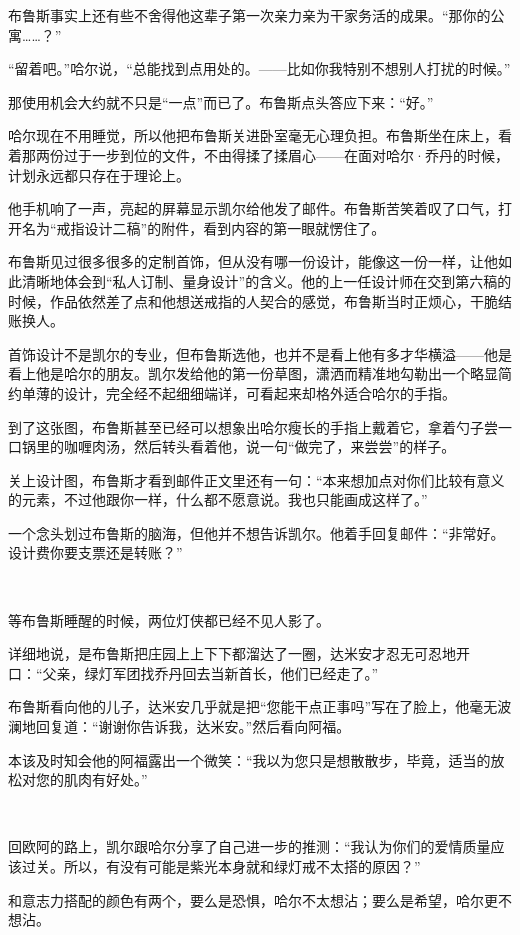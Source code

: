 \documentclass[../main]{subfiles}
\begin{document}
布鲁斯事实上还有些不舍得他这辈子第一次亲力亲为干家务活的成果。“那你的公寓……？”

“留着吧。”哈尔说，“总能找到点用处的。——比如你我特别不想别人打扰的时候。”

那使用机会大约就不只是“一点”而已了。布鲁斯点头答应下来：“好。”

哈尔现在不用睡觉，所以他把布鲁斯关进卧室毫无心理负担。布鲁斯坐在床上，看着那两份过于一步到位的文件，不由得揉了揉眉心——在面对哈尔·乔丹的时候，计划永远都只存在于理论上。

他手机响了一声，亮起的屏幕显示凯尔给他发了邮件。布鲁斯苦笑着叹了口气，打开名为“戒指设计二稿”的附件，看到内容的第一眼就愣住了。

布鲁斯见过很多很多的定制首饰，但从没有哪一份设计，能像这一份一样，让他如此清晰地体会到“私人订制、量身设计”的含义。他的上一任设计师在交到第六稿的时候，作品依然差了点和他想送戒指的人契合的感觉，布鲁斯当时正烦心，干脆结账换人。

首饰设计不是凯尔的专业，但布鲁斯选他，也并不是看上他有多才华横溢——他是看上他是哈尔的朋友。凯尔发给他的第一份草图，潇洒而精准地勾勒出一个略显简约单薄的设计，完全经不起细细端详，可看起来却格外适合哈尔的手指。

到了这张图，布鲁斯甚至已经可以想象出哈尔瘦长的手指上戴着它，拿着勺子尝一口锅里的咖喱肉汤，然后转头看着他，说一句“做完了，来尝尝”的样子。

关上设计图，布鲁斯才看到邮件正文里还有一句：“本来想加点对你们比较有意义的元素，不过他跟你一样，什么都不愿意说。我也只能画成这样了。”

一个念头划过布鲁斯的脑海，但他并不想告诉凯尔。他着手回复邮件：“非常好。设计费你要支票还是转账？”

~\

等布鲁斯睡醒的时候，两位灯侠都已经不见人影了。

详细地说，是布鲁斯把庄园上上下下都溜达了一圈，达米安才忍无可忍地开口：“父亲，绿灯军团找乔丹回去当新首长，他们已经走了。”

布鲁斯看向他的儿子，达米安几乎就是把“您能干点正事吗”写在了脸上，他毫无波澜地回复道：“谢谢你告诉我，达米安。”然后看向阿福。

本该及时知会他的阿福露出一个微笑：“我以为您只是想散散步，毕竟，适当的放松对您的肌肉有好处。”

~\

回欧阿的路上，凯尔跟哈尔分享了自己进一步的推测：“我认为你们的爱情质量应该过关。所以，有没有可能是紫光本身就和绿灯戒不太搭的原因？”

和意志力搭配的颜色有两个，要么是恐惧，哈尔不太想沾；要么是希望，哈尔更不想沾。
\end{document}
